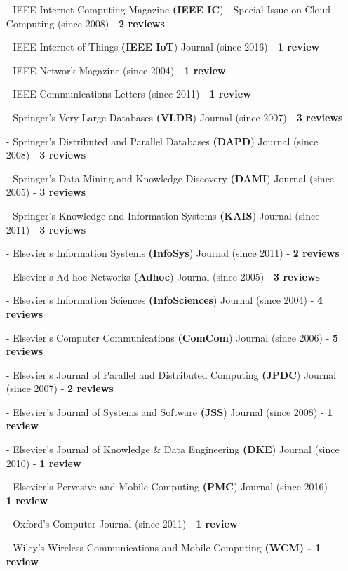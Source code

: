 \documentclass[10pt]{article}
\begin{document}
\begin{itemize}
\begin{itemize}
\item[-] IEEE Internet Computing Magazine {\bf (IEEE IC}) - Special Issue on Cloud Computing (since 2008) - {\bf 2 reviews}
\item[-] IEEE Internet of Things {\bf (IEEE IoT}) Journal (since 2016) - {\bf 1 review}
\item[-] IEEE Network Magazine (since 2004) - {\bf 1 review}
\item[-] IEEE Communications Letters (since 2011) - {\bf 1 review}
\item[-] Springer's Very Large Databases {\bf (VLDB}) Journal (since 2007) - {\bf 3 reviews}
\item[-] Springer's Distributed and Parallel Databases {\bf (DAPD}) Journal (since 2008) - {\bf 3 reviews}
\item[-] Springer's Data Mining and Knowledge Discovery {\bf (DAMI}) Journal (since 2005) - {\bf 3 reviews}
\item[-] Springer's Knowledge and Information Systems {\bf (KAIS}) Journal (since 2011) - {\bf 3 reviews}
\item[-] Elsevier's Information Systems {\bf (InfoSys}) Journal (since 2011) - {\bf 2 reviews}
\item[-] Elsevier's Ad hoc Networks {\bf (Adhoc}) Journal (since 2005) - {\bf 3 reviews}
\item[-] Elsevier's Information Sciences {\bf (InfoSciences}) Journal (since 2004) - {\bf 4 reviews}
\item[-] Elsevier's Computer Communications  {\bf (ComCom}) Journal (since 2006) - {\bf 5 reviews}
\item[-] Elsevier's Journal of Parallel and Distributed Computing {\bf (JPDC}) Journal (since 2007) - {\bf 2 reviews}
\item[-] Elsevier's Journal of Systems and Software {\bf (JSS}) Journal (since 2008) - {\bf 1 review}
\item[-] Elsevier's Journal of Knowledge \& Data Engineering {\bf (DKE}) Journal (since 2010) - {\bf 1 review}
\item[-] Elsevier's Pervasive and Mobile Computing {\bf (PMC}) Journal (since 2016) - {\bf 1 review}
\item[-] Oxford's Computer Journal (since 2011) - {\bf 1 review}

\item[-] Wiley's Wireless Communications and Mobile Computing {\bf (WCM) - {\bf 1 review}}
\end{itemize}


\end{itemize}
\end{document}
